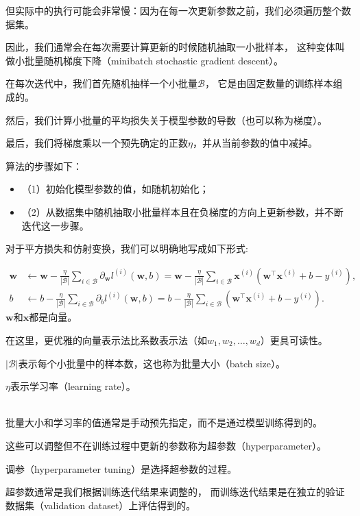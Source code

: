 \documentclass[openany,11pt]{book}
\begin{document}
但实际中的执行可能会非常慢：因为在每一次更新参数之前，我们必须遍历整个数据集。

因此，我们通常会在每次需要计算更新的时候随机抽取一小批样本，
这种变体叫做小批量随机梯度下降（minibatch stochastic gradient descent）。

在每次迭代中，我们首先随机抽样一个小批量$\mathcal{B}$，
它是由固定数量的训练样本组成的。

然后，我们计算小批量的平均损失关于模型参数的导数（也可以称为梯度）。

最后，我们将梯度乘以一个预先确定的正数$\eta$，并从当前参数的值中减掉。

算法的步骤如下：
\begin{itemize}
	\item （1）初始化模型参数的值，如随机初始化；
	\item （2）从数据集中随机抽取小批量样本且在负梯度的方向上更新参数，并不断迭代这一步骤。
\end{itemize}
对于平方损失和仿射变换，我们可以明确地写成如下形式:

$$\begin{aligned} \mathbf{w} &\leftarrow \mathbf{w} -   \frac{\eta}{|\mathcal{B}|} \sum_{i \in \mathcal{B}} \partial_{\mathbf{w}} l^{(i)}(\mathbf{w}, b) = \mathbf{w} - \frac{\eta}{|\mathcal{B}|} \sum_{i \in \mathcal{B}} \mathbf{x}^{(i)} \left(\mathbf{w}^\top \mathbf{x}^{(i)} + b - y^{(i)}\right),\\ b &\leftarrow b -  \frac{\eta}{|\mathcal{B}|} \sum_{i \in \mathcal{B}} \partial_b l^{(i)}(\mathbf{w}, b)  = b - \frac{\eta}{|\mathcal{B}|} \sum_{i \in \mathcal{B}} \left(\mathbf{w}^\top \mathbf{x}^{(i)} + b - y^{(i)}\right). \end{aligned}$$
$\mathbf{w}$和$\mathbf{x}$都是向量。

在这里，更优雅的向量表示法比系数表示法（如$w_1, w_2, \ldots, w_d$）更具可读性。

$|\mathcal{B}|$表示每个小批量中的样本数，这也称为批量大小（batch size）。

$\eta$表示学习率（learning rate）。


~\\
批量大小和学习率的值通常是手动预先指定，而不是通过模型训练得到的。

这些可以调整但不在训练过程中更新的参数称为超参数（hyperparameter）。

调参（hyperparameter tuning）是选择超参数的过程。

超参数通常是我们根据训练迭代结果来调整的，
而训练迭代结果是在独立的验证数据集（validation dataset）上评估得到的。
\end{document}
